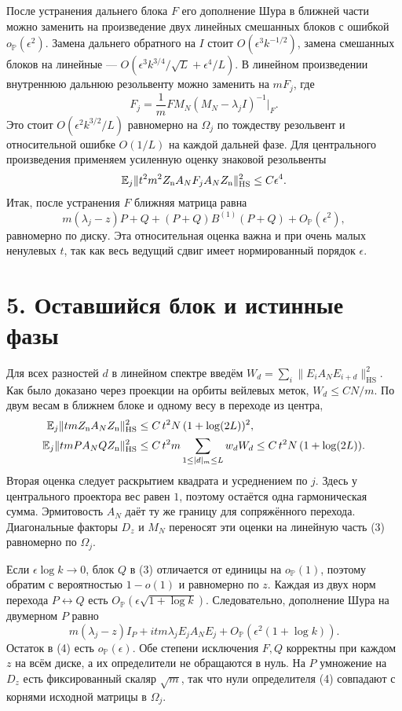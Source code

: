\documentclass[11pt,a4paper]{article}
\newcommand{\EE}{\mathbb E}
\newcommand{\sect}[1]{\section*{\sffamily\color{ink}#1}}
\newcommand{\HS}{\mathrm{HS}}
\begin{document}
После устранения дальнего блока \(F\) его дополнение Шура в ближней части можно заменить на произведение двух линейных смешанных блоков с ошибкой \(o_{\mathbb P}(\epsilon^2)\). Замена дальнего обратного на \(I\) стоит \(O(\epsilon^3 k^{-1/2})\), замена смешанных блоков на линейные --- \(O(\epsilon^3 k^{3/4}/\sqrt L+\epsilon^4/L)\). В линейном произведении внутреннюю дальнюю резольвенту можно заменить на \(mF_j\), где
\[
                F_j=\frac1m F M_N (M_N-\lambda_j I)^{-1}\big|_F.
\]
Это стоит \(O(\epsilon^2k^{3/2}/L)\) равномерно на \(\Omega_j\) по тождеству резольвент и относительной ошибке \(O(1/L)\) на каждой дальней фазе. Для центрального произведения применяем усиленную оценку знаковой резольвенты
\[
        \EE_j\|t^2m^2Z_{\rm n} A_N F_j A_N Z_{\rm n}\|_{\HS}^2
                                 \le C\epsilon^4 .
\]
Итак, после устранения \(F\) ближняя матрица равна
\begin{equation}
      m(\lambda_j-z)P+Q+(P+Q)B^{(1)}(P+Q)
                              +O_{\mathbb P}(\epsilon^2),
                                                               \tag{3}
\end{equation}
равномерно по диску. Эта относительная оценка важна и при очень малых ненулевых \(t\), так как весь ведущий сдвиг имеет нормированный порядок \(\epsilon\).
\newpage
\sect{5. Оставшийся блок и истинные фазы}
Для всех разностей \(d\) в линейном спектре введём \(W_d=\sum_i\|E_i A_N E_{i+d}\|_{\HS}^2\). Как было доказано через проекции на орбиты вейлевых меток, \(W_d\le C N/m\). По двум весам в ближнем блоке и одному весу в переходе из центра,
\begin{align*}
 \EE_j\|tm Z_{\rm n} A_N Z_{\rm n}\|_{\HS}^2
       &\le C\, t^2N\,(1+\log(2L))^2,\\
 \EE_j\|tm P A_N QZ_{\rm n}\|_{\HS}^2
       &\le C\, t^2 m\sum_{1\le |d|_m\le L}w_d W_d
        \le C\,t^2N\,(1+\log(2L)).
\end{align*}
Вторая оценка следует раскрытием квадрата и усреднением по \(j\). Здесь у центрального проектора вес равен \(1\), поэтому остаётся одна гармоническая сумма. Эрмитовость \(A_N\) даёт ту же границу для сопряжённого перехода. Диагональные факторы \(D_z\) и \(M_N\) переносят эти оценки на линейную часть (3) равномерно по \(\Omega_j\).

Если \(\epsilon\log k\to0\), блок \(Q\) в (3) отличается от единицы на \(o_{\mathbb P}(1)\), поэтому обратим с вероятностью \(1-o(1)\) и равномерно по \(z\). Каждая из двух норм перехода \(P\leftrightarrow Q\) есть \(O_{\mathbb P}(\epsilon\sqrt{1+\log k})\). Следовательно, дополнение Шура на двумерном \(P\) равно
\begin{equation}
 m(\lambda_j-z)I_P+itm\lambda_j E_j A_N E_j
              +O_{\mathbb P}(\epsilon^2(1+\log k)).
                                                               \tag{4}
\end{equation}
Остаток в (4) есть \(o_{\mathbb P}(\epsilon)\). Обе степени исключения \(F,Q\) корректны при каждом \(z\) на всём диске, а их определители не обращаются в нуль. На \(P\) умножение на \(D_z\) есть фиксированный скаляр \(\sqrt m\), так что нули определителя (4) совпадают с корнями исходной матрицы в \(\Omega_j\).
\end{document}
